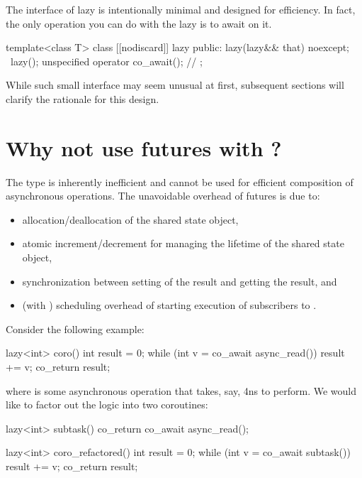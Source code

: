 The interface of lazy is intentionally minimal and designed for efficiency. In fact, the only operation you can do with the lazy is to await on it.

\begin{codeblock}
template<class T>
class [[nodiscard]] lazy {
public:
  lazy(lazy&& that) noexcept;
  ~lazy();
  unspecified operator co_await(); // \expos
};
\end{codeblock}

While such small interface may seem unusual at first, subsequent sections will clarify the rationale for this design.

\section{Why not use futures with ?}

The  type is inherently inefficient and cannot be used for efficient composition of asynchronous operations.
The unavoidable overhead of futures is due to:
\begin{itemize}
\item allocation/deallocation of the shared state object,
\item atomic increment/decrement for managing the lifetime of the shared state object,
\item synchronization between setting of the result and getting the result, and
\item (with ) scheduling overhead of starting execution of subscribers to .
\end{itemize}

Consider the following example:
\begin{codeblock}
lazy<int> coro() {
  int result = 0;
  while (int v = co_await async_read())
    result += v;
  co_return result;
}
\end{codeblock}
where  is some asynchronous operation that takes, say, 4ns to perform.
We would like to factor out the logic into two coroutines:
\begin{codeblock}
lazy<int> subtask() {
  co_return co_await async_read();
}

lazy<int> coro_refactored() {
  int result = 0;
  while (int v = co_await subtask())
    result += v;
  co_return result;
}
\end{codeblock}

